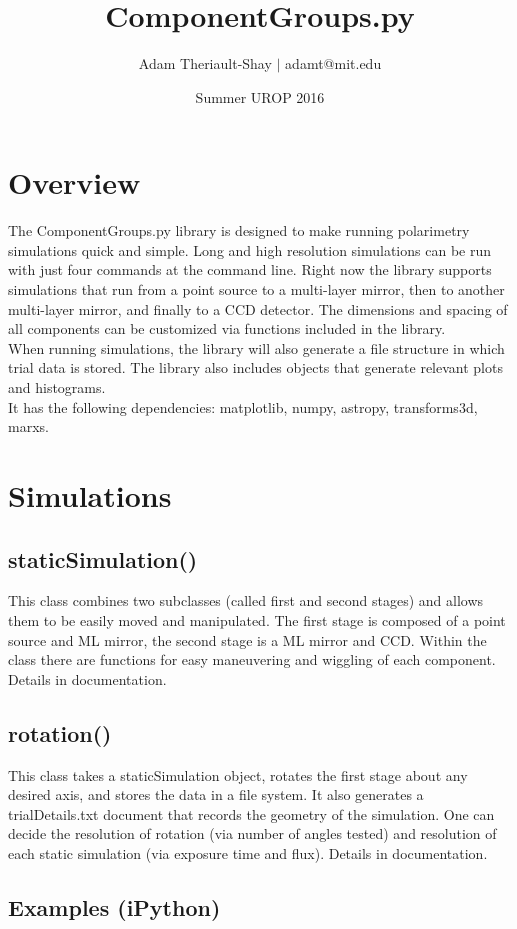 \documentclass[11pt, oneside]{ltxdoc}   	%
\title{ComponentGroups.py}
\author{Adam Theriault-Shay $\vert$ adamt@mit.edu}
\date{Summer UROP 2016}							%
\begin{document}
\maketitle
\section{Overview}
The ComponentGroups.py library is designed to make running polarimetry simulations quick and simple. Long and high resolution simulations can be run with just four commands at the command line. Right now the library supports simulations that run from a point source to a multi-layer mirror, then to another multi-layer mirror, and finally to a CCD detector. The dimensions and spacing of all components can be customized via functions included in the library.\\
When running simulations, the library will also generate a file structure in which trial data is stored. The library also includes objects that generate relevant plots and histograms.\\
It has the following dependencies: matplotlib, numpy, astropy, transforms3d, marxs.

\section{Simulations}
\subsection{staticSimulation()}
This class combines two subclasses (called first and second stages) and allows them to be easily moved and manipulated. The first stage is composed of a point source and ML mirror, the second stage is a ML mirror and CCD. Within the class there are functions for easy maneuvering and wiggling of each component. Details in documentation.
\subsection{rotation()}
This class takes a staticSimulation object, rotates the first stage about any desired axis, and stores the data in a file system. It also generates a trialDetails.txt document that records the geometry of the simulation. One can decide the resolution of rotation (via number of angles tested) and resolution of each static simulation (via exposure time and flux). Details in documentation.
\subsection{Examples (iPython)}
\end{document}
